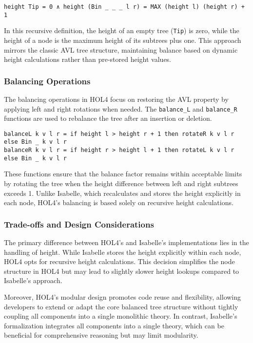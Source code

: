 \documentclass[12pt]{article}
\begin{document}
\begin{verbatim}
height Tip = 0 ∧ height (Bin _ _ _ l r) = MAX (height l) (height r) + 1
\end{verbatim}

In this recursive definition, the height of an empty tree (\texttt{Tip}) is zero, while the height of a node is the maximum height of its subtrees plus one. This approach mirrors the classic AVL tree structure, maintaining balance based on dynamic height calculations rather than pre-stored height values.

\subsubsection{Balancing Operations}
The balancing operations in HOL4 focus on restoring the AVL property by applying left and right rotations when needed. The \texttt{balance\_L} and \texttt{balance\_R} functions are used to rebalance the tree after an insertion or deletion.

\begin{verbatim}
balanceL k v l r = if height l > height r + 1 then rotateR k v l r else Bin _ k v l r
balanceR k v l r = if height r > height l + 1 then rotateL k v l r else Bin _ k v l r
\end{verbatim}

These functions ensure that the balance factor remains within acceptable limits by rotating the tree when the height difference between left and right subtrees exceeds 1. Unlike Isabelle, which recalculates and stores the height explicitly in each node, HOL4’s balancing is based solely on recursive height calculations.

\subsubsection{Trade-offs and Design Considerations}
The primary difference between HOL4’s and Isabelle’s implementations lies in the handling of height. While Isabelle stores the height explicitly within each node, HOL4 opts for recursive height calculations. This decision simplifies the node structure in HOL4 but may lead to slightly slower height lookups compared to Isabelle’s approach.

Moreover, HOL4's modular design promotes code reuse and flexibility, allowing developers to extend or adapt the core balanced tree structure without tightly coupling all components into a single monolithic theory. In contrast, Isabelle's formalization integrates all components into a single theory, which can be beneficial for comprehensive reasoning but may limit modularity.
\end{document}
